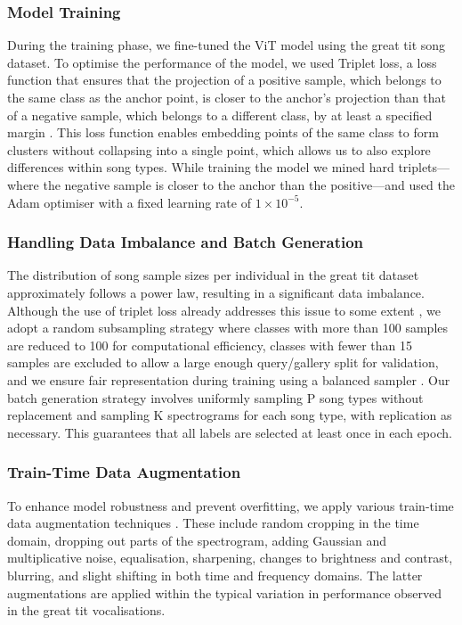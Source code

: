 \subsubsection{Model Training}
During the training phase, we fine-tuned the ViT model using the great tit song dataset. To optimise the performance of the model, we used Triplet loss, a loss function that ensures that the projection of a positive sample, which belongs to the same class as the anchor point, is closer to the anchor's projection than that of a negative sample, which belongs to a different class, by at least a specified margin \parencite{hermans2017, hoffer2018}. This loss function enables embedding points of the same class to form clusters without collapsing into a single point, which allows us to also explore differences within song types. While training the model we mined hard triplets---where the negative sample is closer to the anchor than the positive---and used the Adam optimiser with a fixed learning rate of $1 \times 10^{-5}$.

\subsubsection{Handling Data Imbalance and Batch Generation}
The distribution of song sample sizes per individual in the great tit dataset approximately follows a power law, resulting in a significant data imbalance. Although the use of triplet loss already addresses this issue to some extent \parencite{thakur2019}, we adopt a random subsampling strategy where classes with more than 100 samples are reduced to 100 for computational efficiency, classes with fewer than 15 samples are excluded to allow a large enough query/gallery split for validation, and we ensure fair representation during training using a balanced sampler \parencite{hermans2017}. Our batch generation strategy involves uniformly sampling P song types without replacement and sampling K spectrograms for each song type, with replication as necessary. This guarantees that all labels are selected at least once in each epoch.

\subsubsection{Train-Time Data Augmentation}
To enhance model robustness and prevent overfitting, we apply various train-time data augmentation techniques \parencite{mumuni2022, perez2017, shorten2019}. These include random cropping in the time domain, dropping out parts of the spectrogram, adding Gaussian and multiplicative noise, equalisation, sharpening, changes to brightness and contrast, blurring, and slight shifting in both time and frequency domains. The latter augmentations are applied within the typical variation in performance observed in the great tit vocalisations.


